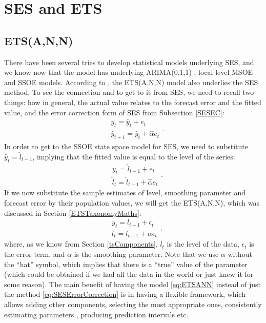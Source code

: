 \documentclass[
]{book}
\theoremstyle{definition}
\theoremstyle{definition}
\theoremstyle{definition}
\theoremstyle{definition}
\theoremstyle{remark}
\begin{document}
\hypertarget{SESandETS}{%
\section{SES and ETS}\label{SESandETS}}

\hypertarget{etsann}{%
\subsection{ETS(A,N,N)}\label{etsann}}

There have been several tries to develop statistical models underlying SES, and we know now that the model has underlying ARIMA(0,1,1) \citep{Muth1960}, local level MSOE \citep[Multiple Source of Error,][]{Muth1960} and SSOE \citep[Single Source of Error,][]{Snyder1985} models. According to \citet{Hyndman2002}, the ETS(A,N,N) model also underlies the SES method. To see the connection and to get to it from SES, we need to recall two things: how in general, the actual value relates to the forecast error and the fitted value, and the error correction form of SES from Subsection \ref{SESEC}:
\begin{equation}
  \begin{aligned}
    & y_t = \hat{y}_{t} + e_t \\
    & \hat{y}_{t+1} = \hat{y}_{t} + \hat{\alpha} e_{t}
  \end{aligned} .
  \label{eq:ETSANNDerivation01}
\end{equation}
In order to get to the SSOE state space model for SES, we need to substitute \(\hat{y}_t=\hat{l}_{t-1}\), implying that the fitted value is equal to the level of the series:
\begin{equation}
  \begin{aligned}
    & y_t = \hat{l}_{t-1} + e_t \\
    & \hat{l}_{t} = \hat{l}_{t-1} + \hat{\alpha} e_{t}
  \end{aligned} .
  \label{eq:ETSANN01}
\end{equation}
If we now substitute the sample estimates of level, smoothing parameter and forecast error by their population values, we will get the ETS(A,N,N), which was discussed in Section \ref{ETSTaxonomyMaths}:
\begin{equation}
  \begin{aligned}
    & y_{t} = l_{t-1} + \epsilon_t \\
    & l_t = l_{t-1} + \alpha \epsilon_t
  \end{aligned} ,
  \label{eq:ETSANN}
\end{equation}
where, as we know from Section \ref{tsComponents}, \(l_t\) is the level of the data, \(\epsilon_t\) is the error term, and \(\alpha\) is the smoothing parameter. Note that we use \(\alpha\) without the ``hat'' symbol, which implies that there is a ``true'' value of the parameter (which could be obtained if we had all the data in the world or just knew it for some reason). The main benefit of having the model \eqref{eq:ETSANN} instead of just the method \eqref{eq:SESErrorCorrection} is in having a flexible framework, which allows adding other components, selecting the most appropriate ones, consistently estimating parameters \citep[see Section 4.3 of][]{SvetunkovSBA}, producing prediction intervals etc.
\end{document}
